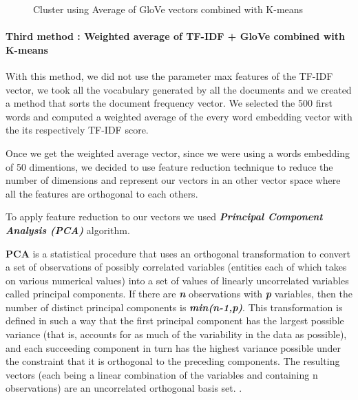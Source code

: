 \documentclass[article,twocolumn]{IEEEtran}
\begin{document}
    \begin{figure}
        \begin{center}\end{center}
        \caption{Cluster using Average of GloVe vectors combined with K-means }
        \label{fig4}
    \end{figure}
    
    \hypertarget{third-method-weighted-average-of-tf-idf-glove-combined-with-k-means}{%
\paragraph{Third method : Weighted average of TF-IDF + GloVe combined
with
K-means}\label{third-method-weighted-average-of-tf-idf-glove-combined-with-k-means}}

With this method, we did not use the parameter max features of the
TF-IDF vector, we took all the vocabulary generated by all the documents
and we created a method that sorts the document frequency vector. We
selected the 500 first words and computed a weighted average of the
every word embedding vector with the its respectively TF-IDF score.

Once we get the weighted average vector, since we were using a words
embedding of 50 dimentions, we decided to use feature reduction
technique to reduce the number of dimensions and represent our vectors
in an other vector space where all the features are orthogonal to each
others.

To apply feature reduction to our vectors we used
\textbf{\emph{Principal Component Analysis (PCA)}} algorithm.

\textbf{PCA} is a statistical procedure that uses an orthogonal
transformation to convert a set of observations of possibly correlated
variables (entities each of which takes on various numerical values)
into a set of values of linearly uncorrelated variables called principal
components. If there are \textbf{\emph{n}} observations with
\textbf{\emph{p}} variables, then the number of distinct principal
components is \textbf{\emph{min(n-1,p)}}. This transformation is defined
in such a way that the first principal component has the largest
possible variance (that is, accounts for as much of the variability in
the data as possible), and each succeeding component in turn has the
highest variance possible under the constraint that it is orthogonal to
the preceding components. The resulting vectors (each being a linear
combination of the variables and containing n observations) are an
uncorrelated orthogonal basis set. \cite{PCA}.
\end{document}
